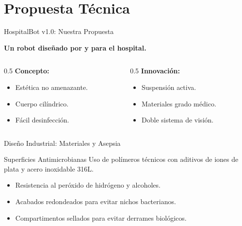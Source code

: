 \section{Propuesta Técnica}
\begin{frame}{HospitalBot v1.0: Nuestra Propuesta}
    \begin{center}
        \textbf{Un robot diseñado por y para el hospital.}
    \end{center}
    \begin{columns}
        \begin{column}{0.5\textwidth}
            \textbf{Concepto:}
            \begin{itemize}
                \item Estética no amenazante.
                \item Cuerpo cilíndrico.
                \item Fácil desinfección.
            \end{itemize}
        \end{column}
        \begin{column}{0.5\textwidth}
            \textbf{Innovación:}
            \begin{itemize}
                \item Suspensión activa.
                \item Materiales grado médico.
                \item Doble sistema de visión.
            \end{itemize}
        \end{column}
    \end{columns}
\end{frame}

\begin{frame}{Diseño Industrial: Materiales y Asepsia}
    \begin{block}{Superficies Antimicrobianas}
        Uso de polímeros técnicos con aditivos de iones de plata y acero inoxidable 316L.
    \end{block}
    \begin{itemize}
        \item[$\checkmark$] Resistencia al peróxido de hidrógeno y alcoholes.
        \item[$\checkmark$] Acabados redondeados para evitar nichos bacterianos.
        \item[$\checkmark$] Compartimentos sellados para evitar derrames biológicos.
    \end{itemize}
\end{frame}

